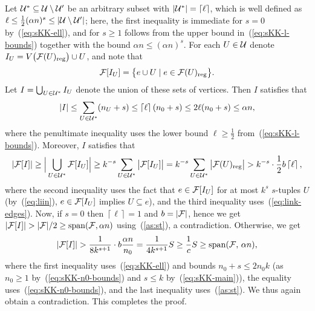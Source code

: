 \documentclass[11pt]{article}
\makeatletter
\renewenvironment{proof}[1][\proofname]
{\par\pushQED{\qed}
	\normalfont\topsep6\p@\@plus6\p@\relax\trivlist
	\item[\hskip\labelsep\bfseries#1\@addpunct{.}]
	\ignorespaces}
{\popQED\endtrivlist\@endpefalse}
\newcommand{\FF}{{\cal F}}
\newcommand{\UU}{{\cal U}}
\newcommand{\ceil}[1]{\left\lceil #1 \right\rceil}
\renewcommand{\wp}{\mathrm{span}}
\renewcommand{\a}{\alpha}
\newcommand{\sub}{\subseteq}
\makeatother
\begin{document}
\begin{proof}[Proof of Theorem~\ref{th:skk}]
	Let $\UU^* \sub \UU \setminus \UU'$ be an arbitrary subset with $|\UU^*|=\ceil{\ell}$, 
	which is well defined as $\ell \le \frac12 (\a n)^s \le |\UU \setminus \UU'|$; here, the first inequality is immediate for $s=0$ by~(\ref{eq:sKK-ell}), and for $s\ge 1$ follows from the upper bound in~(\ref{eq:sKK-l-bounds}) together with the bound $\a n \le (\a n)^s$.
	For each $U \in \UU$ denote $I_U = V\big(\FF(U)\reg\big) \cup U$, and note that
	\begin{equation}\label{eq:liin}
	\FF[I_U] = \big\{e \cup U \mid e  \in \FF(U)\reg\big\}.
	\end{equation}
	Let $I = \bigcup_{U \in \UU^*} I_U$ denote the union of these sets of vertices. Then $I$ satisfies that
	$$|I| \le \sum_{U \in \UU^*} (n_U+s) \le \ceil{\ell} (n_0+s) \le 2\ell(n_0+s) \le \a n ,$$
	where the penultimate inequality uses the lower bound $\ell \ge \frac12$ from~(\ref{eq:sKK-l-bounds}).
	Moreover, $I$ satisfies that
	$$|\FF[I]| \ge \Big|\bigcup_{U \in \UU^*} \FF[I_U] \Big|
	\ge k^{-s} \sum_{U \in \UU^*} \big|\FF[I_U]\big|
	= k^{-s} \sum_{U \in \UU^*} \big|\FF(U)\reg\big|
	> k^{-s} \cdot \frac12 b \ceil{\ell},$$
	where the second inequality uses the fact that
	$e \in \FF[I_U]$ for at most $k^s$ $s$-tuples $U$ 
	(by~(\ref{eq:liin}), $e \in \FF[I_U]$ implies $U \sub e$), and the third inequality uses~(\ref{eq:link-edges}).
	Now, if $s=0$ then $\ceil{\ell}=1$ and $b=|\FF|$, hence we get $|\FF[I]| > |\FF|/2 \ge \wp(\FF,\a n)$ using~(\ref{as:st}), a contradiction.
	Otherwise, we get
	$$|\FF[I]| > \frac{1}{8 k^{s+1}} \cdot b\frac{\a n}{n_0}
	= \frac{1}{4k^{s+1}} S \ge \frac{1}{c}S \ge \wp(\FF,\,\a n),$$
	where the first inequality uses~(\ref{eq:sKK-ell}) and bounds $n_0+s \le 2n_0k$ (as $n_0 \ge 1$ by~(\ref{eq:sKK-n0-bounds}) and $s \le k$ by~(\ref{eq:sKK-main})), 
	the equality uses~(\ref{eq:sKK-n0-bounds}), 
	and the last inequality uses~(\ref{as:st}).
	We thus again obtain a contradiction.
	This completes the proof. %
\end{proof}
\end{document}
